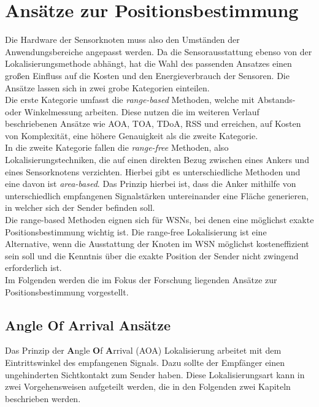 \documentclass[12pt, a4wide]{scrreprt}
\begin{document}

\chapter{Ansätze zur Positionsbestimmung}
Die Hardware der Sensorknoten muss also den Umständen der Anwendungsbereiche angepasst werden. Da die Sensorausstattung ebenso von der Lokalisierungsmethode abhängt, hat die Wahl des passenden Ansatzes einen großen Einfluss auf die Kosten und den Energieverbrauch der Sensoren. Die Ansätze lassen sich in zwei grobe Kategorien einteilen.\\
\indent
Die erste Kategorie umfasst die \textit{range-based} Methoden, welche mit Abstands- oder Winkelmessung arbeiten. Diese nutzen die im weiteren Verlauf beschriebenen Ansätze wie AOA, TOA, TDoA, RSS und erreichen, auf Kosten von Komplexität, eine höhere Genauigkeit als die zweite Kategorie.\\
\indent
In die zweite Kategorie fallen die \textit{range-free} Methoden, also Lokalisierungstechniken, die auf einen direkten Bezug zwischen eines Ankers und eines Sensorknotens verzichten. Hierbei gibt es unterschiedliche Methoden und eine davon ist \textit{area-based}\cite{area_based}. Das Prinzip hierbei ist, dass die Anker mithilfe von unterschiedlich empfangenen Signalstärken untereinander eine Fläche generieren, in welcher sich der Sender befinden soll.\\
\indent
Die range-based Methoden eignen sich für WSNs, bei denen eine möglichst exakte Positionsbestimmung wichtig ist. Die range-free Lokalisierung ist eine Alternative, wenn die Ausstattung der Knoten im WSN möglichst kosteneffizient sein soll und die Kenntnis über die exakte Position der Sender nicht zwingend erforderlich ist.\\ 
\indent
Im Folgenden werden die im Fokus der Forschung liegenden Ansätze zur Positionsbestimmung vorgestellt.
  \section{Angle Of Arrival Ansätze}
Das Prinzip der {\bf A}ngle {\bf O}f {\bf A}rrival (AOA) Lokalisierung arbeitet mit dem Eintrittswinkel des empfangenen Signals. Dazu sollte der Empfänger einen ungehinderten Sichtkontakt zum Sender haben. Diese Lokalisierungsart kann in zwei Vorgehensweisen aufgeteilt werden, die in den Folgenden zwei Kapiteln beschrieben werden.
\newpage    
\end{document}
